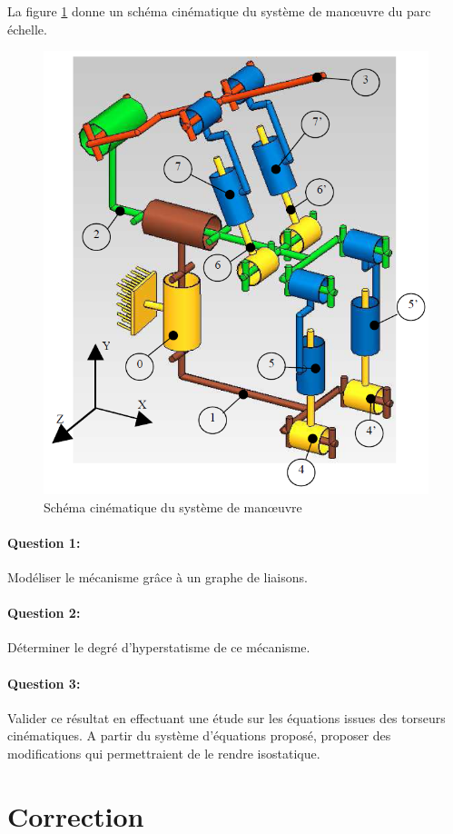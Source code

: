 La figure \ref{fig:image2} donne un schéma cinématique du système de man\oe uvre du parc échelle.

\begin{figure}[htbp]
\begin{center}
\includegraphics[width=0.4\linewidth]{img/epas_hyp.png}
\caption{Schéma cinématique du système de man\oe uvre}
\label{fig:image2}
\end{center}
\end{figure}

\paragraph{Question 1:}

Modéliser le mécanisme grâce à un graphe de liaisons.

\paragraph{Question 2:}

Déterminer le degré d'hyperstatisme de ce mécanisme.

\paragraph{Question 3:}

Valider ce résultat en effectuant une étude sur les équations issues des torseurs cinématiques. A partir du système d'équations proposé, proposer des modifications qui permettraient de le rendre isostatique.

\clearpage

\ifdef{\public}{}{}

\newpage

\pagestyle{correction}\setcounter{section}{0}

\section{Correction}

